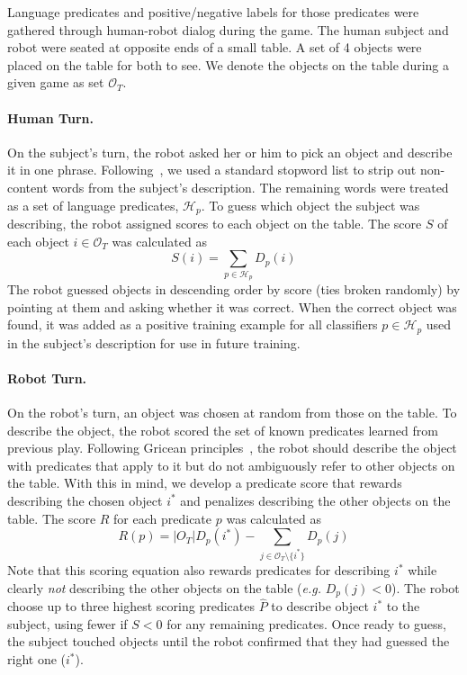 Language predicates and positive/negative labels for those predicates were gathered through human-robot dialog during the \ispy game.
The human subject and robot were seated at opposite ends of a small table.
A set of 4 objects were placed on the table for both to see.
We denote the objects on the table during a given game as set $\mathcal{O}_T$.

\paragraph{Human Turn.} On the subject's turn, the robot asked her or him to pick an object and describe it in one phrase.
Following~\cite{parde:ijcai15}, we used a standard stopword list to strip out non-content words from the subject's description.
The remaining words were treated as a set of language predicates, $\mathcal{H}_p$.
To guess which object the subject was describing, the robot assigned scores to each object on the table.
The score $S$ of each object $i\in \mathcal{O}_T$ was calculated as
\begin{equation}
	S(i) = \sum_{p\in \mathcal{H}_p}{D_p(i)}
\end{equation}
The robot guessed objects in descending order by score (ties broken randomly) by pointing at them and asking whether it was correct.
When the correct object was found, it was added as a positive training example for all classifiers  $p\in \mathcal{H}_p$ used in the subject's description for use in future training.

\paragraph{Robot Turn.} On the robot's turn, an object was chosen at random from those on the table.
To describe the object, the robot scored the set of known predicates learned from previous play.
Following Gricean principles~\cite{grice:bkchapter75}, the robot should describe the object with predicates that apply to it but do not ambiguously refer to other objects on the table.
With this in mind, we develop a predicate score that rewards describing the chosen object $i^*$ and penalizes describing the other objects on the table.
The score $R$ for each predicate $p$ was calculated as
\begin{equation}
	R(p) = |O_T|D_p(i^*) - \sum_{j\in{\mathcal{O}_T}\setminus\{i^*\}}{D_p(j)}
\end{equation}
Note that this scoring equation also rewards predicates for describing $i^*$ while clearly {\it not} describing the other objects on the table (\textit{e.g.}  $D_p(j)<0$).
The robot choose up to three highest scoring predicates $\hat{P}$ to describe object $i^*$ to the subject, using fewer if $S<0$ for any remaining predicates.
Once ready to guess, the subject touched objects until the robot confirmed that they had guessed the right one ($i^*$).

